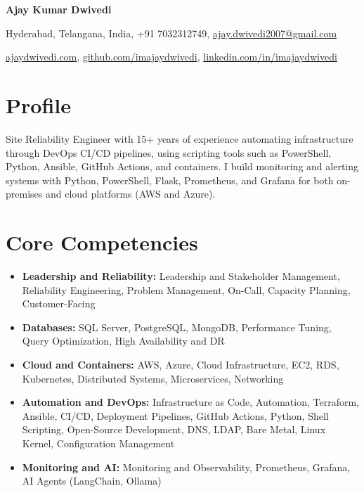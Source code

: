 \documentclass[10pt,a4paper]{article}
\begin{document}
\begin{center}
{\Huge\bfseries Ajay Kumar Dwivedi}

\vspace{6pt}
Hyderabad, Telangana, India, +91 7032312749, \href{mailto:ajay.dwivedi2007@gmail.com}{ajay.dwivedi2007@gmail.com}

\vspace{2pt}
\href{https://ajaydwivedi.com/}{ajaydwivedi.com}, \href{https://github.com/imajaydwivedi}{github.com/imajaydwivedi}, \href{https://linkedin.com/in/imajaydwivedi/}{linkedin.com/in/imajaydwivedi}
\end{center}

\section{Profile}
Site Reliability Engineer with 15+ years of experience automating infrastructure through DevOps CI/CD pipelines, using scripting tools such as PowerShell, Python, Ansible, GitHub Actions, and containers. I build monitoring and alerting systems with Python, PowerShell, Flask, Prometheus, and Grafana for both on-premises and cloud platforms (AWS and Azure).

\section{Core Competencies}
\begin{itemize}
  \item \textbf{Leadership and Reliability:} Leadership and Stakeholder Management, Reliability Engineering, Problem Management, On-Call, Capacity Planning, Customer-Facing
  \item \textbf{Databases:} SQL Server, PostgreSQL, MongoDB, Performance Tuning, Query Optimization, High Availability and DR
  \item \textbf{Cloud and Containers:} AWS, Azure, Cloud Infrastructure, EC2, RDS, Kubernetes, Distributed Systems, Microservices, Networking
  \item \textbf{Automation and DevOps:} Infrastructure as Code, Automation, Terraform, Ansible, CI/CD, Deployment Pipelines, GitHub Actions, Python, Shell Scripting, Open-Source Development, DNS, LDAP, Bare Metal, Linux Kernel, Configuration Management
  \item \textbf{Monitoring and AI:} Monitoring and Observability, Prometheus, Grafana, AI Agents (LangChain, Ollama)
\end{itemize}
\end{document}
